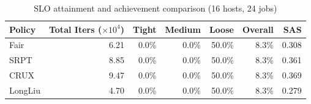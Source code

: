 \begin{table}[t]
\centering
\caption{SLO attainment and achievement comparison (16 hosts, 24 jobs)}
\label{tab:slo_16host}
\begin{tabular}{l|r|r|r|r|r|r}
\hline
Policy & Total Iters ($\times 10^4$) & Tight & Medium & Loose & Overall & SAS \\
\hline
Fair & 6.21 & 0.0\% & 0.0\% & 50.0\% & 8.3\% & 0.308 \\
SRPT & 8.85 & 0.0\% & 0.0\% & 50.0\% & 8.3\% & 0.361 \\
CRUX & 9.47 & 0.0\% & 0.0\% & 50.0\% & 8.3\% & 0.369 \\
LongLiu & 4.70 & 0.0\% & 0.0\% & 50.0\% & 8.3\% & 0.279 \\
\hline
\end{tabular}
\end{table}
